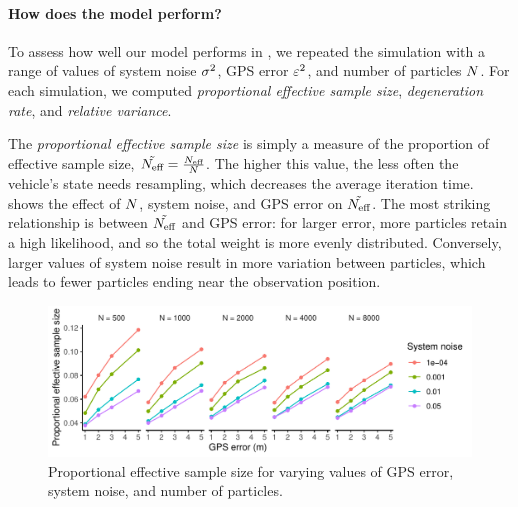 \paragraph{How does the model perform?}





To assess how well our model performs in \rt{}, we repeated the simulation with a range of values of system noise $\sigma^2$, GPS error $\varepsilon^2$, and number of particles $N$. For each simulation, we computed \emph{proportional effective sample size}, \emph{degeneration rate}, and \emph{relative variance}.

The \emph{proportional effective sample size} is simply a measure of the proportion of effective sample size, $\tilde{N_\text{eff}} = \frac{N_\text{eff}}{N}$. The higher this value, the less often the vehicle's state needs resampling, which decreases the average iteration time.  shows the effect of $N$, system noise, and GPS error on $\tilde{N_\text{eff}}$. The most striking relationship is between $\tilde{N_\text{eff}}$ and GPS error: for larger error, more particles retain a high likelihood, and so the total weight is more evenly distributed. Conversely, larger values of system noise result in more variation between particles, which leads to fewer particles ending near the observation position.

\begin{knitrout}\small
{}\color{fgcolor}\begin{figure}

{\centering \includegraphics[width=\textwidth]{figure/model_performance_neff-1} 

}

\caption[Proportional effective sample size for varying values of GPS error, system noise, and number of particles]{Proportional effective sample size for varying values of GPS error, system noise, and number of particles.}\label{fig:model_performance_neff}
\end{figure}


\end{knitrout}


